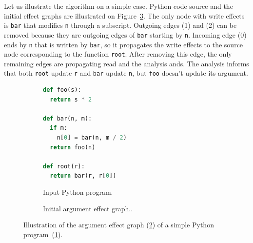 \documentclass[10pt, preprint]{sigplanconf}
\begin{document}
Let us illustrate the algorithm on a simple case. Python code source and the
initial effect graphs are illustrated on Figure~\ref{fig:argument-effects}. The
only node with write effects is \texttt{bar} that modifies \texttt{n} through a
subscript. Outgoing edges (1) and (2) can be removed because they are
outgoing edges of \texttt{bar} starting by \texttt{n}. Incoming edge (0) ends
by \texttt{n} that is written by \texttt{bar}, so it propagates the write
effects to the source node corresponding to the function \texttt{root}. After
removing this edge, the only remaining edges are propagating read and the
analysis ands. The analysis informs that both \texttt{root} update \texttt{r}
and \texttt{bar} update \texttt{n}, but \texttt{foo} doesn't update its
argument.

\begin{figure}

    \begin{subfigure}{.5\textwidth}
        \begin{lstlisting}[language=python]
def foo(s):
  return s * 2

def bar(n, m):
  if m:
    n[0] = bar(n, m / 2)
  return foo(n)

def root(r):
  return bar(r, r[0])
        \end{lstlisting}
        \caption{Input Python program.}
        \label{fig:argument-effects-code}
    \end{subfigure}

    \begin{subfigure}{.5\textwidth}
        \centering
        \caption{Initial argument effect graph..}
        \label{fig:argument-effects-graph}
    \end{subfigure}

    \caption{Illustration of the argument effect graph (\ref{fig:argument-effects-graph}) of a simple Python program~(\ref{fig:argument-effects-code}).}
    \label{fig:argument-effects}

\end{figure}
\end{document}
